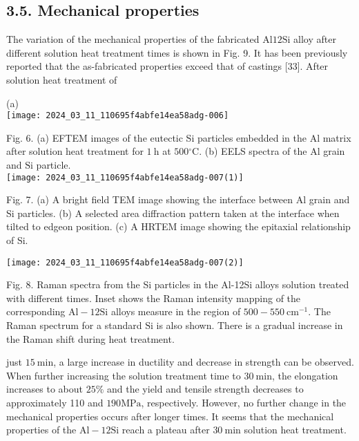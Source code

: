 \documentclass[10pt]{article}
\begin{document}
\subsection*{3.5. Mechanical properties}
The variation of the mechanical properties of the fabricated Al$12 \mathrm{Si}$ alloy after different solution heat treatment times is shown in Fig. 9. It has been previously reported that the as-fabricated properties exceed that of castings [33]. After solution heat treatment of

(a)\\
\texttt{[image: 2024\_03\_11\_110695f4abfe14ea58adg-006]}

Fig. 6. (a) EFTEM images of the eutectic Si particles embedded in the $\mathrm{Al}$ matrix after solution heat treatment for $1 \mathrm{~h}$ at $500{ }^{\circ} \mathrm{C}$. (b) EELS spectra of the $\mathrm{Al}$ grain and $\mathrm{Si}$ particle.\\
\texttt{[image: 2024\_03\_11\_110695f4abfe14ea58adg-007(1)]}

Fig. 7. (a) A bright field TEM image showing the interface between Al grain and Si particles. (b) A selected area diffraction pattern taken at the interface when tilted to edgeon position. (c) A HRTEM image showing the epitaxial relationship of Si.

\begin{center}
\texttt{[image: 2024\_03\_11\_110695f4abfe14ea58adg-007(2)]}
\end{center}

Fig. 8. Raman spectra from the Si particles in the Al-12Si alloys solution treated with different times. Inset shows the Raman intensity mapping of the corresponding $\mathrm{Al}-12 \mathrm{Si}$ alloys measure in the region of $500-550 \mathrm{~cm}^{-1}$. The Raman spectrum for a standard $\mathrm{Si}$ is also shown. There is a gradual increase in the Raman shift during heat treatment.

just $15 \mathrm{~min}$, a large increase in ductility and decrease in strength can be observed. When further increasing the solution treatment time to $30 \mathrm{~min}$, the elongation increases to about $25 \%$ and the yield and tensile strength decreases to approximately 110 and $190 \mathrm{MPa}$, respectively. However, no further change in the mechanical properties occurs after longer times. It seems that the mechanical properties of the $\mathrm{Al}-12 \mathrm{Si}$ reach a plateau after $30 \mathrm{~min}$ solution heat treatment.
\end{document}
